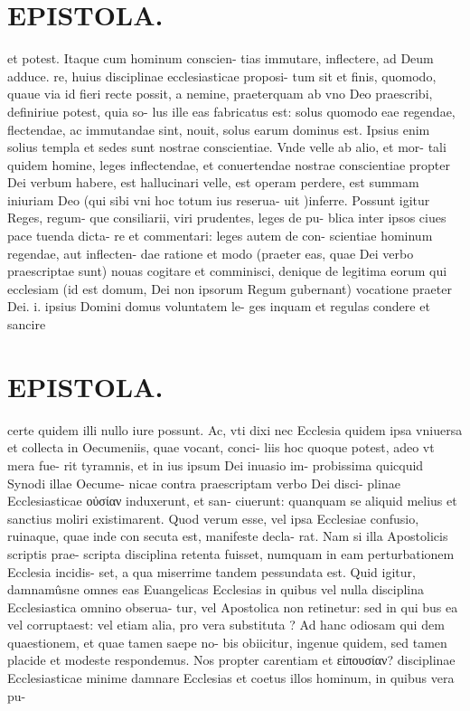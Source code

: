 \documentclass{article}
\begin{document}
\begin{pages}
\section*{EPISTOLA. }\pstart et potest. Itaque cum hominum conscien- tias immutare, inflectere, ad Deum adduce. re, huius disciplinae ecclesiasticae proposi- tum sit et finis, quomodo, quaue via id fieri recte possit, a nemine, praeterquam ab vno Deo praescribi, definiriue potest, quia so- lus ille eas fabricatus est: solus quomodo eae regendae, flectendae, ac immutandae sint, nouit, solus earum dominus est. Ipsius enim solius templa et sedes sunt nostrae conscientiae. Vnde velle ab alio, et mor- tali quidem homine, leges inflectendae, et conuertendae nostrae conscientiae propter Dei verbum habere, est hallucinari velle, est operam perdere, est summam iniuriam Deo (qui sibi vni hoc totum ius reserua- uit )inferre. Possunt igitur Reges, regum- que consiliarii, viri prudentes, leges de pu- blica inter ipsos ciues pace tuenda dicta- re et commentari: leges autem de con- scientiae hominum regendae, aut inflecten- dae ratione et modo (praeter eas, quae Dei verbo praescriptae sunt) nouas cogitare et comminisci, denique de legitima eorum qui ecclesiam (id est domum, Dei non ipsorum Regum gubernant) vocatione praeter Dei. i. ipsius Domini domus voluntatem le- ges inquam et regulas condere et sancire  \pend
\section*{EPISTOLA. }\pstart certe quidem illi nullo iure possunt. Ac, vti dixi nec Ecclesia quidem ipsa vniuersa et collecta in Oecumeniis, quae vocant, conci- liis hoc quoque potest, adeo vt mera fue- rit tyramnis, et in ius ipsum Dei inuasio im- probissima quicquid Synodi illae Oecume- nicae contra praescriptam verbo Dei disci- plinae Ecclesiasticae οὐσίαν induxerunt, et san- ciuerunt: quanquam se aliquid melius et sanctius moliri existimarent. Quod verum esse, vel ipsa Ecclesiae confusio, ruinaque, quae inde con secuta est, manifeste decla- rat. Nam si illa Apostolicis scriptis prae- scripta disciplina retenta fuisset, numquam in eam perturbationem Ecclesia incidis- set, a qua miserrime tandem pessundata est. Quid igitur, damnamûsne omnes eas Euangelicas Ecclesias in quibus vel nulla disciplina Ecclesiastica omnino obserua- tur, vel Apostolica non retinetur: sed in qui bus ea vel corruptaest: vel etiam alia, pro vera substituta ? Ad hanc odiosam qui dem quaestionem, et quae tamen saepe no- bis obiicitur, ingenue quidem, sed tamen placide et modeste respondemus. Nos propter carentiam et εἰπουσίαν? disciplinae Ecclesiasticae minime damnare Ecclesias et coetus illos hominum, in quibus vera pu-  \pend

\end{pages}
\end{document}
